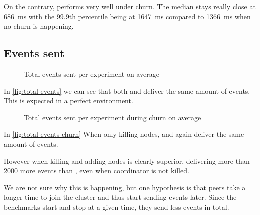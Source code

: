 On the contrary, \epto performs very well under churn. The median stays really close at \SI{686}{\milli\second} with the 99.9th percentile being at \SI{1647}{\milli\second} compared to \SI{1366}{\milli\second} when no churn is happening.
\newpage
\subsection{Events sent}
\begin{figure}[h]
	\centering
	
	\vspace{-2mm} 
	\caption{Total events sent per experiment on average}
	\vspace{-2mm}
	\label{fig:total-events}   
\end{figure}
In \autoref{fig:total-events} we can see that both \epto and \jgroups deliver the same amount of events. This is expected in a perfect environment.
\begin{figure}[h]
	\centering
	
	\vspace{-2mm} 
	\caption{Total events sent per experiment during churn on average}
	\vspace{-2mm}
	\label{fig:total-events-churn}  
\end{figure}

In \autoref{fig:total-events-churn} When only killing nodes, \epto and \jgroups again deliver the same amount of events.

However when killing and adding nodes \epto is clearly superior, delivering more than 2000 more events than \jgroups, even when \jgroups coordinator is not killed.

We are not sure why this is happening, but one hypothesis is that \jgroups peers take a longer time to join the cluster and thus start sending events later. Since the benchmarks start and stop at a given time, they send less events in total.


